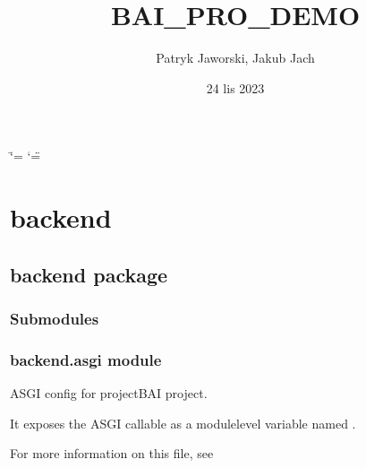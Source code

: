 \documentclass[letterpaper,11pt,polish]{sphinxmanual}
\title{BAI\_PRO\_DEMO}
\date{24 lis 2023}
\author{Patryk Jaworski, Jakub Jach}
\begin{document}
\ifdefined\shorthandoff
  \ifnum\catcode`\=\string=\active\shorthandoff{=}\fi
  \ifnum\catcode`\"=\active{}\fi
\fi

\pagestyle{empty}
\sphinxmaketitle
\pagestyle{plain}
\sphinxtableofcontents
\pagestyle{normal}
\label{\detokenize{index::doc}}


\sphinxstepscope


\chapter{backend}
\label{\detokenize{modules:backend}}\label{\detokenize{modules::doc}}
\sphinxstepscope


\section{backend package}
\label{\detokenize{backend:backend-package}}\label{\detokenize{backend::doc}}

\subsection{Submodules}
\label{\detokenize{backend:submodules}}

\subsection{backend.asgi module}
\label{\detokenize{backend:module-backend.asgi}}\label{\detokenize{backend:backend-asgi-module}}
\sphinxAtStartPar
ASGI config for projectBAI project.

\sphinxAtStartPar
It exposes the ASGI callable as a module\sphinxhyphen{}level variable named .

\sphinxAtStartPar
For more information on this file, see
\end{document}
